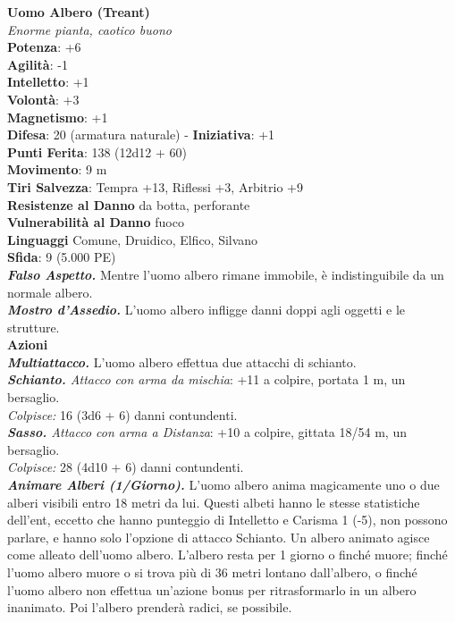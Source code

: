 \begin{multicols}{2}
\medskip\textbf{Uomo Albero (Treant)}\\
\emph{Enorme pianta, caotico buono}\\
\textbf{Potenza}: +6\\
\textbf{Agilità}: -1\\
\textbf{Intelletto}: +1\\
\textbf{Volontà}: +3\\
\textbf{Magnetismo}: +1\\
\textbf{Difesa}: 20 (armatura naturale) - \textbf{Iniziativa}: +1\\
\textbf{Punti Ferita}: 138 (12d12 + 60)\\
\textbf{Movimento}: 9 m\\
\textbf{Tiri Salvezza}: Tempra +13, Riflessi +3, Arbitrio +9\\
\textbf{Resistenze al Danno} da botta, perforante\\
\textbf{Vulnerabilità al Danno} fuoco\\
\textbf{Linguaggi} Comune, Druidico, Elfico, Silvano\\
\textbf{Sfida}: 9 (5.000 PE)\smallskip\\
\emph{\textbf{Falso Aspetto.}} Mentre l'uomo albero rimane immobile, è indistinguibile da un normale albero.\\
\emph{\textbf{Mostro d'Assedio.}} L'uomo albero infligge danni doppi agli oggetti e le strutture.\\
\smallskip\textbf{Azioni}\\
\emph{\textbf{Multiattacco.}} L'uomo albero effettua due attacchi di schianto.\\
\emph{\textbf{Schianto.} Attacco con arma da mischia}: +11 a colpire, portata 1 m, un bersaglio.\\
\emph{Colpisce:} 16 (3d6 + 6) danni contundenti.\\
\emph{\textbf{Sasso.} Attacco con arma a Distanza}: +10 a colpire, gittata 18/54 m, un bersaglio.\\
\emph{Colpisce:} 28 (4d10 + 6) danni contundenti.\\
\emph{\textbf{Animare Alberi (1/Giorno).}} L'uomo albero anima magicamente uno o due alberi visibili entro 18 metri da lui. Questi albeti hanno le stesse statistiche dell'ent, eccetto che hanno punteggio di Intelletto e Carisma 1 (-5), non possono parlare, e hanno solo l'opzione di attacco Schianto. Un albero animato agisce come alleato dell'uomo albero. L'albero resta per 1 giorno o finché muore; finché l'uomo albero muore o si trova più di 36 metri lontano dall'albero, o finché l'uomo albero non effettua un'azione bonus per ritrasformarlo in un albero inanimato. Poi l'albero prenderà radici, se possibile. \\

\end{multicols}
